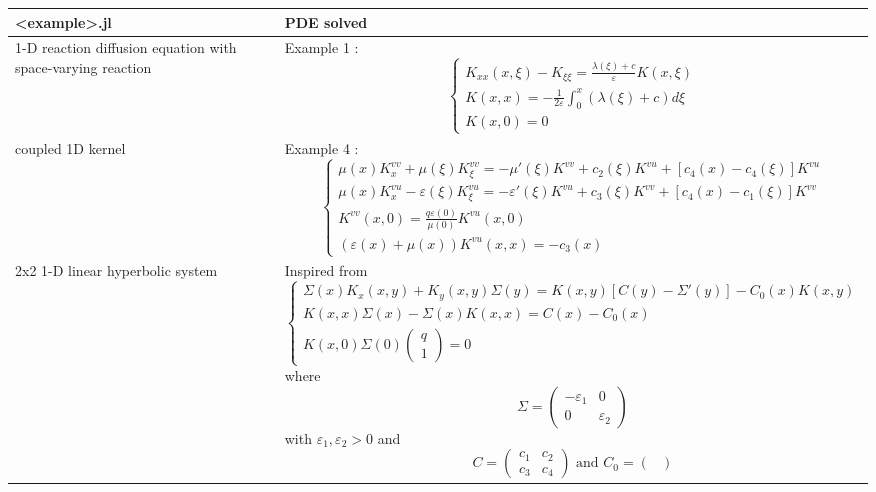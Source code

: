 \documentclass[11pt,a4paper]{article}
\newcommand{\eps}{\varepsilon}
\begin{document}
\begin{center}
    \begin{tabular}{ | m{100pt} | m{340pt} | } 
        \hline
        <example>.jl & PDE solved \\
        \hline
        1-D reaction diffusion equation with space-varying reaction & Example 1 : 
        $$\begin{cases}
            K_{xx}(x, \xi) - K_{\xi \xi} = \frac{\lambda(\xi)+c}{\eps}K(x,\xi) \\
            K(x,x) = -\frac{1}{2\eps}\int_{0}^{x}(\lambda(\xi)+c)d\xi \\
            K(x,0) = 0
        \end{cases}$$ \\
        \hline
        coupled 1D kernel & Example 4 : 
        $$\begin{cases}
            \mu(x)K^{vv}_x + \mu(\xi)K^{vv}_\xi = -\mu'(\xi)K^{vv} + c_2(\xi)K^{vu} + [c_4(x)-c_4(\xi)]K^{vu} \\
            \mu(x)K^{vu}_x - \eps(\xi)K^{vu}_\xi = -\eps'(\xi)K^{vu} + c_3(\xi)K^{vv} + [c_4(x)-c_1(\xi)]K^{vv} \\
            K^{vv}(x,0) = \frac{q\eps(0)}{\mu(0)}K^{vu}(x,0) \\
            (\eps(x) + \mu(x))K^{vu}(x,x) = -c_3(x)
        \end{cases}$$ \\
        \hline
        2x2 1-D linear hyperbolic system & Inspired from ~\cite{coron-vazquez}
        $$\begin{cases}
            \Sigma(x)K_x(x,y) + K_y(x,y)\Sigma(y) = K(x,y)[C(y)-\Sigma'(y)] - C_0(x)K(x,y) \\
            K(x,x)\Sigma(x) - \Sigma(x)K(x,x) = C(x) - C_0(x) \\
            K(x,0)\Sigma(0)\begin{pmatrix}
                q \\ 1
            \end{pmatrix} = 0
        \end{cases}$$ 
        where
        $$\Sigma = \begin{pmatrix}
            -\eps_1 & 0 \\ 0 & \eps_2
        \end{pmatrix}$$ with $\eps_1, \eps_2 > 0$ and 
        $$C = \begin{pmatrix}
            c_1 & c_2 \\ c_3 & c_4
        \end{pmatrix} \text{ and } C_0 = \begin{pmatrix}

\end{pmatrix}$$
\end{tabular}
\end{center}
\end{document}
